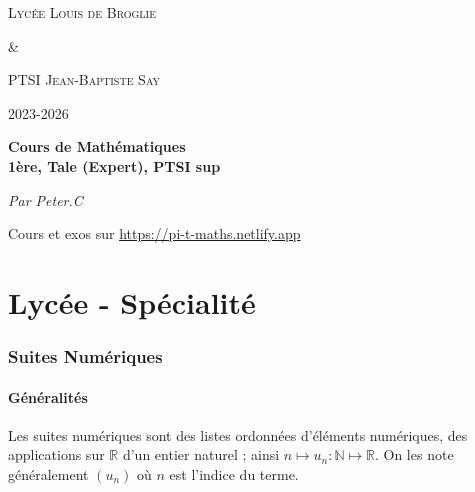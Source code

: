 \documentclass{report}
\begin{document}
    \begin{titlepage}
        \centering
        \vspace*{2cm}
        {\scshape\Large Lycée Louis de Broglie \par}
        {\scshape\Large \& \par}
        {\scshape\Large PTSI Jean-Baptiste Say \par}
        \vspace{1cm}
        {\scshape\Large 2023-2026 \par}
        \vspace{1.5cm}
        {\huge\bfseries Cours de Mathématiques \\ 1ère, Tale (Expert), PTSI sup\par}
        \vspace{2cm}
        {\Large\itshape Par Peter.C\par}
        \vfill
        {\large Cours et exos sur \url{https://pi-t-maths.netlify.app}\par}

    \end{titlepage}





  \newpage

    \renewcommand{\contentsname}{Sommaire}
    \tableofcontents

  \newpage

  \part{Lycée - Spécialité}
  
    \setcounter{section}{0}

    \section{Suites Numériques}

    \subsection{Généralités}

    Les suites numériques sont des listes ordonnées d'éléments numériques, des applications sur $\mathbb{R}$ d'un entier naturel ; ainsi $n \mapsto u_n : \mathbb{N} \mapsto \mathbb{R}$. On les note généralement $(u_n)$ où $n$ est l'indice du terme.
\end{document}
